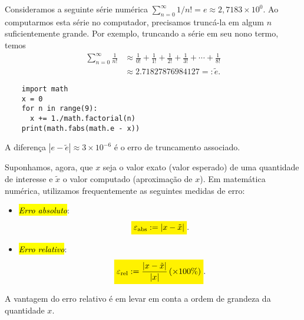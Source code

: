 \begin{ex}\label{ex:erro_de_truncamento}
  Consideramos a seguinte série numérica $\sum_{n=0}^\infty 1/n! = e \approx 2,7183\times 10^0$. Ao computarmos esta série no computador, precisamos truncá-la em algum $n$ suficientemente grande. Por exemplo, truncando a série em seu nono termo, temos
  \begin{align}
    \sum_{n=0}^\infty \frac{1}{n!} &\approx \frac{1}{0!} + \frac{1}{1!} + \frac{1}{2!} + \frac{1}{3!} + \cdots + \frac{1}{8!} \\
    &\approx 2.71827876984127 =: \tilde{e}.
  \end{align}

  
  \begin{lstlisting}
    import math
    x = 0
    for n in range(9):
      x += 1./math.factorial(n)
    print(math.fabs(math.e - x))
  \end{lstlisting}
  
A diferença $|e - \tilde{e}| \approx 3\times 10^{-6}$ é o erro de truncamento associado.
\end{ex}

Suponhamos, agora, que $x$ seja o valor exato (valor esperado) de uma quantidade de interesse e $\tilde{x}$ o valor computado (aproximação de $x$). Em matemática numérica, utilizamos frequentemente as seguintes medidas de erro:
\begin{itemize}
  \item \hl{\emph{Erro absoluto}}:
    \begin{equation}
      \hleq{\varepsilon_{\text{abs}} := |x - \tilde{x}|}.
    \end{equation}
  \item \hl{\emph{Erro relativo}}:
    \begin{equation}
      \hleq{\varepsilon_{\text{rel}} := \frac{|x - \tilde{x}|}{|x|}\left(\times 100\%\right)}.
    \end{equation}
\end{itemize}

A vantagem do erro relativo é em levar em conta a ordem de grandeza da quantidade $x$.

